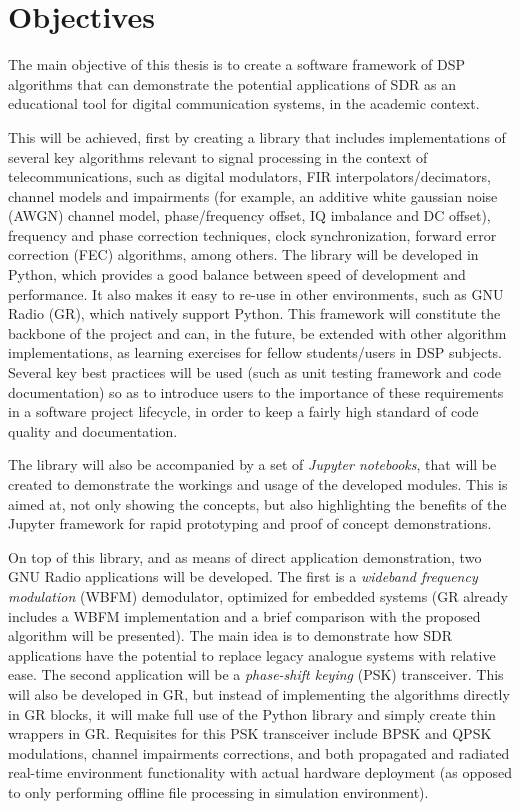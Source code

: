\section{Objectives}
\label{sect:objectives}
The main objective of this thesis is to create a software framework of DSP algorithms that can demonstrate the potential applications of SDR as an educational tool for digital communication systems, in the academic context.

This will be achieved, first by creating a library that includes implementations of several key algorithms relevant to signal processing in the context of telecommunications, such as digital modulators, FIR interpolators/decimators, channel models and impairments (for example, an additive white gaussian noise (AWGN) channel model, phase/frequency offset, IQ imbalance and DC offset), frequency and phase correction techniques, clock synchronization, forward error correction (FEC) algorithms, among others. The library will be developed in Python, which provides a good balance between speed of development and performance. It also makes it easy to re-use in other environments, such as GNU Radio (GR), which natively support Python. This framework will constitute the backbone of the project and can, in the future, be extended with other algorithm implementations, as learning exercises for fellow students/users in DSP subjects. Several key best practices will be used (such as unit testing framework and code documentation) so as to introduce users to the importance of these requirements in a software project lifecycle, in order to keep a fairly high standard of code quality and documentation.

The library will also be accompanied by a set of \emph{Jupyter notebooks}, that will be created to demonstrate the workings and usage of the developed modules. This is aimed at, not only showing the concepts, but also highlighting the benefits of the Jupyter framework for rapid prototyping and proof of concept demonstrations.

On top of this library, and as means of direct application demonstration, two GNU Radio applications will be developed. The first is a \emph{wideband frequency modulation} (WBFM) demodulator, optimized for embedded systems (GR already includes a WBFM implementation \cite{gnuradio_wbfm_receiver} and a brief comparison with the proposed algorithm will be presented). The main idea is to demonstrate how SDR applications have the potential to replace legacy analogue systems with relative ease. The second application will be a \emph{phase-shift keying} (PSK) transceiver. This will also be developed in GR, but instead of implementing the algorithms directly in GR blocks, it will make full use of the Python library and simply create thin wrappers in GR. Requisites for this PSK transceiver include BPSK and QPSK modulations, channel impairments corrections, and both propagated and radiated real-time environment functionality with actual hardware deployment (as opposed to only performing offline file processing in simulation environment).

